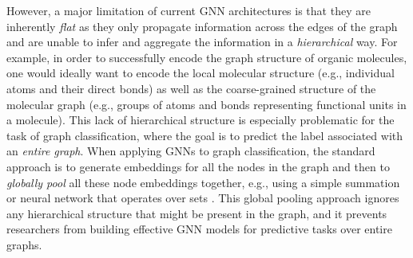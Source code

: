 However, a major limitation of current GNN architectures is that they are inherently {\em flat} as they only propagate information across the edges of the graph and are unable to infer and aggregate the information in a \textit{hierarchical} way. 
For example, in order to successfully encode the graph structure of organic molecules, one would ideally want to encode the local molecular structure (e.g., individual atoms and their direct bonds) as well as the coarse-grained structure of the molecular graph (e.g., groups of atoms and bonds representing functional units in a molecule).
%
This lack of hierarchical structure is especially problematic for the task of graph classification, where the goal is to predict the label associated with an \textit{entire graph}. When applying GNNs to graph classification, the standard approach is to generate embeddings for all the nodes in the graph and then to {\em globally pool} all these node embeddings together, e.g., using a simple summation or neural network that operates over sets \cite{dai2016discriminative,Duv+2015,Gil+2017,Li+2016}. This global pooling approach ignores any hierarchical structure that might be present in the graph, and it prevents researchers from building effective GNN models for predictive tasks over entire graphs.%


